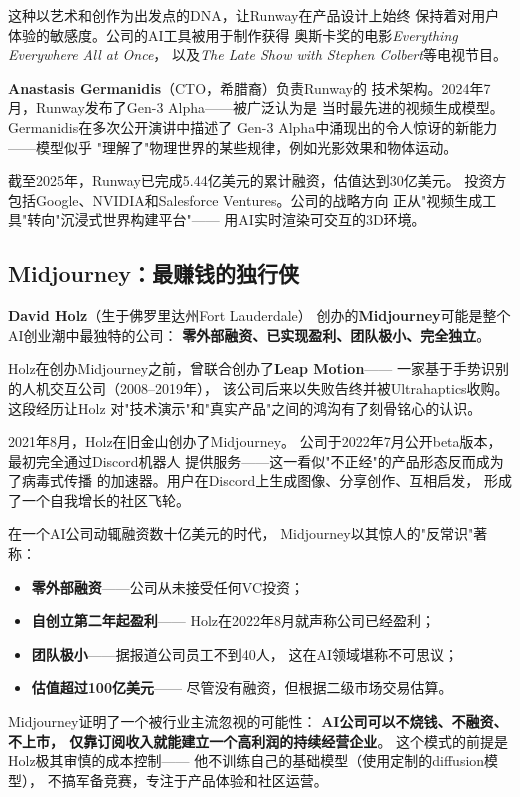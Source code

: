 这种以艺术和创作为出发点的DNA，让Runway在产品设计上始终
保持着对用户体验的敏感度。公司的AI工具被用于制作获得
奥斯卡奖的电影\textit{Everything Everywhere All at Once}，
以及\textit{The Late Show with Stephen Colbert}等电视节目。

\textbf{Anastasis Germanidis}（CTO，希腊裔）负责Runway的
技术架构。2024年7月，Runway发布了Gen-3 Alpha——被广泛认为是
当时最先进的视频生成模型。Germanidis在多次公开演讲中描述了
Gen-3 Alpha中涌现出的令人惊讶的新能力——模型似乎
"理解了"物理世界的某些规律，例如光影效果和物体运动。

截至2025年，Runway已完成5.44亿美元的累计融资，估值达到30亿美元。
投资方包括Google、NVIDIA和Salesforce Ventures。公司的战略方向
正从"视频生成工具"转向"沉浸式世界构建平台"——
用AI实时渲染可交互的3D环境。

\subsection{Midjourney：最赚钱的独行侠}

\textbf{David Holz}（生于佛罗里达州Fort Lauderdale）
创办的\textbf{Midjourney}可能是整个AI创业潮中最独特的公司：
\textbf{零外部融资、已实现盈利、团队极小、完全独立}。

Holz在创办Midjourney之前，曾联合创办了\textbf{Leap Motion}——
一家基于手势识别的人机交互公司（2008--2019年），
该公司后来以失败告终并被Ultrahaptics收购。这段经历让Holz
对"技术演示"和"真实产品"之间的鸿沟有了刻骨铭心的认识。

2021年8月，Holz在旧金山创办了Midjourney。
公司于2022年7月公开beta版本，最初完全通过Discord机器人
提供服务——这一看似"不正经"的产品形态反而成为了病毒式传播
的加速器。用户在Discord上生成图像、分享创作、互相启发，
形成了一个自我增长的社区飞轮。

\begin{corebox}
在一个AI公司动辄融资数十亿美元的时代，
Midjourney以其惊人的"反常识"著称：
\begin{itemize}
  \item \textbf{零外部融资}——公司从未接受任何VC投资；
  \item \textbf{自创立第二年起盈利}——
    Holz在2022年8月就声称公司已经盈利；
  \item \textbf{团队极小}——据报道公司员工不到40人，
    这在AI领域堪称不可思议；
  \item \textbf{估值超过100亿美元}——
    尽管没有融资，但根据二级市场交易估算。
\end{itemize}
Midjourney证明了一个被行业主流忽视的可能性：
\textbf{AI公司可以不烧钱、不融资、不上市，
仅靠订阅收入就能建立一个高利润的持续经营企业}。
这个模式的前提是Holz极其审慎的成本控制——
他不训练自己的基础模型（使用定制的diffusion模型），
不搞军备竞赛，专注于产品体验和社区运营。
\end{corebox}

